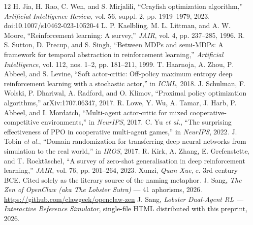 \documentclass[11pt,a4paper]{article}
\begin{document}
\begin{thebibliography}{12}
 H. Jia, H. Rao, C. Wen, and S. Mirjalili, ``Crayfish optimization algorithm,'' \emph{Artificial Intelligence Review}, vol. 56, suppl. 2, pp. 1919--1979, 2023. doi:10.1007/s10462-023-10520-4
 L. P. Kaelbling, M. L. Littman, and A. W. Moore, ``Reinforcement learning: A survey,'' \emph{JAIR}, vol. 4, pp. 237--285, 1996.
 R. S. Sutton, D. Precup, and S. Singh, ``Between MDPs and semi-MDPs: A framework for temporal abstraction in reinforcement learning,'' \emph{Artificial Intelligence}, vol. 112, nos. 1--2, pp. 181--211, 1999.
 T. Haarnoja, A. Zhou, P. Abbeel, and S. Levine, ``Soft actor-critic: Off-policy maximum entropy deep reinforcement learning with a stochastic actor,'' in \emph{ICML}, 2018.
 J. Schulman, F. Wolski, P. Dhariwal, A. Radford, and O. Klimov, ``Proximal policy optimization algorithms,'' arXiv:1707.06347, 2017.
 R. Lowe, Y. Wu, A. Tamar, J. Harb, P. Abbeel, and I. Mordatch, ``Multi-agent actor-critic for mixed cooperative-competitive environments,'' in \emph{NeurIPS}, 2017.
 C. Yu \emph{et al.}, ``The surprising effectiveness of PPO in cooperative multi-agent games,'' in \emph{NeurIPS}, 2022.
 J. Tobin \emph{et al.}, ``Domain randomization for transferring deep neural networks from simulation to the real world,'' in \emph{IROS}, 2017.
 R. Kirk, A. Zhang, E. Grefenstette, and T. Rockt\"aschel, ``A survey of zero-shot generalisation in deep reinforcement learning,'' \emph{JAIR}, vol. 76, pp. 201--264, 2023.
 Xunzi, \emph{Quan Xue}, c. 3rd century BCE. Cited solely as the literary source of the naming metaphor.
 J. Sang, \emph{The Zen of OpenClaw (aka The Lobster Sutra)} --- 41 aphorisms, 2026. \url{https://github.com/clawgeek/openclaw-zen}
 J. Sang, \emph{Lobster Dual-Agent RL --- Interactive Reference Simulator}, single-file HTML distributed with this preprint, 2026.
\end{thebibliography}
\end{document}
